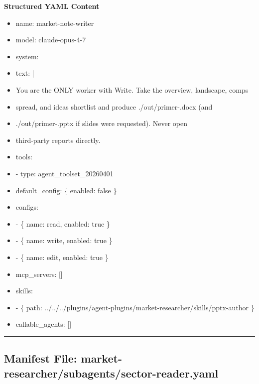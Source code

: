 \documentclass[11pt]{article}
\begin{document}
\textbf{Structured YAML Content}
\begin{itemize}[leftmargin=*,itemsep=2pt,topsep=2pt]
\item {} name: market-note-writer
\item {} model: claude-opus-4-7
\item {} system:
\item {} text: |
\item {} You are the ONLY worker with Write. Take the overview, landscape, comps
\item {} spread, and ideas shortlist and produce ./out/primer-.docx (and
\item {} ./out/primer-.pptx if slides were requested). Never open
\item {} third-party reports directly.
\item {} tools:
\item {} - type: agent\_\allowbreak{}toolset\_\allowbreak{}20260401
\item {} default\_\allowbreak{}config: \{ enabled: false \}
\item {} configs:
\item {} - \{ name: read, enabled: true \}
\item {} - \{ name: write, enabled: true \}
\item {} - \{ name: edit, enabled: true \}
\item {} mcp\_\allowbreak{}servers: []
\item {} skills:
\item {} - \{ path: ../../../plugins/agent-plugins/market-researcher/skills/pptx-author \}
\item {} callable\_\allowbreak{}agents: []
\end{itemize}

\vspace{0.8em}\hrule\vspace{0.8em}

\subsection{Manifest File: market-researcher/subagents/sector-reader.yaml}\label{file:market-researcher-subagents-sector-reader-yaml}
\end{document}
